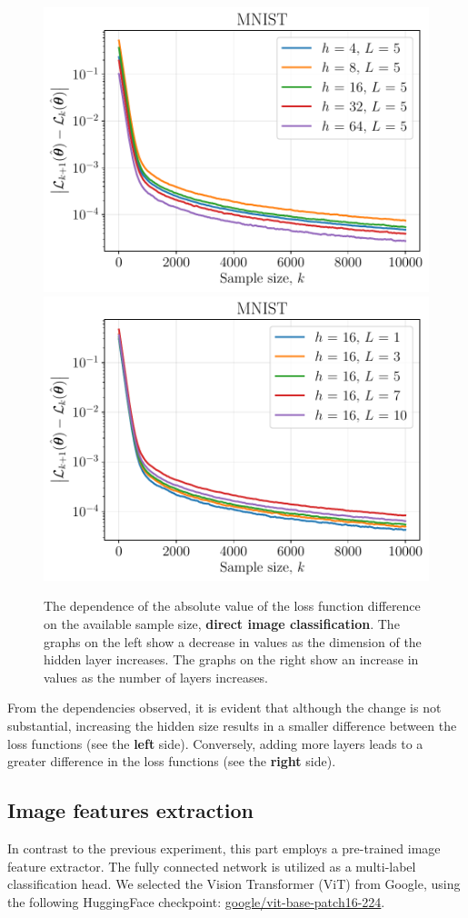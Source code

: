 \documentclass{article}
\begin{document}
\begin{figure}[ht]
    \centering
    \includegraphics[width=0.5\linewidth]{figs/mnist_hidden_size.pdf}\hfill
    \includegraphics[width=0.5\linewidth]{figs/mnist_num_layers.pdf}
    \caption{The dependence of the absolute value of the loss function difference on the available sample size, \textbf{direct image classification}. The graphs on the left show a decrease in values as the dimension of the hidden layer increases. The graphs on the right show an increase in values as the number of layers increases.}
    \label{fig:mnist}
\end{figure}

From the dependencies observed, it is evident that although the change is not substantial, increasing the hidden size results in a smaller difference between the loss functions (see the \textbf{left} side). Conversely, adding more layers leads to a greater difference in the loss functions (see the \textbf{right} side).

\subsection{Image features extraction} 

In contrast to the previous experiment, this part employs a pre-trained image feature extractor. The fully connected network is utilized as a multi-label classification head. We selected the Vision Transformer (ViT) \cite{wu2020visual} from Google, using the following HuggingFace checkpoint: \href{https://huggingface.co/google/vit-base-patch16-224}{google/vit-base-patch16-224}.
\end{document}
